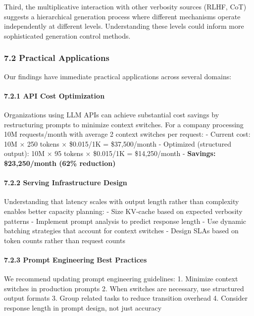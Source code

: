 \documentclass[
  11pt]{article}
\begin{document}
Third, the multiplicative interaction with other verbosity sources
(RLHF, CoT) suggests a hierarchical generation process where different
mechanisms operate independently at different levels. Understanding
these levels could inform more sophisticated generation control methods.

\subsubsection{7.2 Practical Applications}\label{practical-applications}

Our findings have immediate practical applications across several
domains:

\paragraph{7.2.1 API Cost Optimization}\label{api-cost-optimization}

Organizations using LLM APIs can achieve substantial cost savings by
restructuring prompts to minimize context switches. For a company
processing 10M requests/month with average 2 context switches per
request: - Current cost: 10M × 250 tokens × \$0.015/1K = \$37,500/month
- Optimized (structured output): 10M × 95 tokens × \$0.015/1K =
\$14,250/month - \textbf{Savings: \$23,250/month (62\% reduction)}

\paragraph{7.2.2 Serving Infrastructure
Design}\label{serving-infrastructure-design}

Understanding that latency scales with output length rather than
complexity enables better capacity planning: - Size KV-cache based on
expected verbosity patterns - Implement prompt analysis to predict
response length - Use dynamic batching strategies that account for
context switches - Design SLAs based on token counts rather than request
counts

\paragraph{7.2.3 Prompt Engineering Best
Practices}\label{prompt-engineering-best-practices}

We recommend updating prompt engineering guidelines: 1. Minimize context
switches in production prompts 2. When switches are necessary, use
structured output formats 3. Group related tasks to reduce transition
overhead 4. Consider response length in prompt design, not just accuracy
\end{document}
